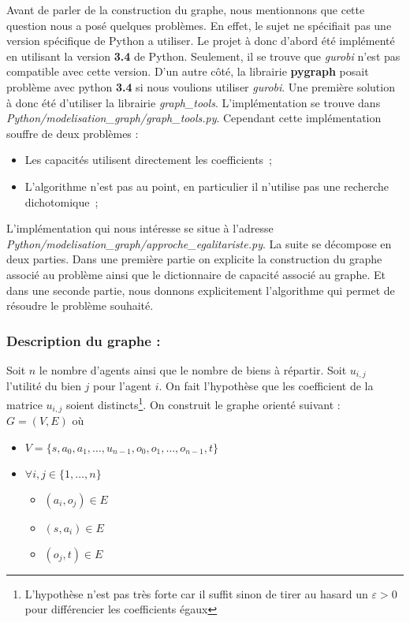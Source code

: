 \documentclass[a4paper, titlepage, oneside, 12pt]{article}%
\begin{document}
Avant de parler de la construction du graphe, nous mentionnons que cette question nous a posé quelques problèmes. En effet, le sujet ne spécifiait pas une version spécifique de Python a utiliser. Le projet à donc d'abord été implémenté en utilisant la version \textbf{3.4} de Python. Seulement, il se trouve que \textit{gurobi} n'est pas compatible avec cette version. D'un autre côté, la librairie \textbf{pygraph} posait problème avec python \textbf{3.4} si nous voulions utiliser \textit{gurobi}. Une première solution à donc été d'utiliser la librairie \textit{graph\_tools}. L'implémentation se trouve dans \textit{Python/modelisation\_graph/graph\_tools.py}. Cependant cette implémentation souffre de deux problèmes :
\begin{itemize}
\item Les capacités utilisent directement les coefficients~;
\item L'algorithme n'est pas au point, en particulier il n'utilise pas une recherche dichotomique~;
\end{itemize}

L'implémentation qui nous intéresse se situe à l'adresse \textit{Python/modelisation\_graph/approche\_egalitariste.py}. La suite se décompose en deux parties. Dans une première partie on explicite la construction du graphe associé au problème ainsi que le dictionnaire de capacité associé au graphe. Et dans une seconde partie, nous donnons explicitement l'algorithme qui permet de résoudre le problème souhaité.

\subsubsection{Description du graphe : } 

Soit $n$ le nombre d'agents ainsi que le nombre de biens à répartir. Soit $u_{i,j}$ l'utilité du bien $j$ pour l'agent $i$. 
On fait l'hypothèse que les coefficient de la matrice $u_{i,j}$ soient distincts\footnote{L'hypothèse n'est pas très forte car il suffit sinon de tirer au hasard un $\varepsilon>0$ pour différencier les coefficients égaux}. 
On construit le graphe orienté suivant :
$G=(V,E)$ où 
\begin{itemize}
\item $V=\{s,a_0,a_1,\dots, u_{n-1}, o_0,o_1,\dots, o_{n-1},t\}$
\item $\forall i,j \in \{1,\dots, n\} $
  \begin{itemize}
  \item $(a_i,o_j)\in E $
  \item $(s,a_i)\in E$
  \item $(o_j,t) \in E$
  \end{itemize}
\end{itemize}  
\end{document}
